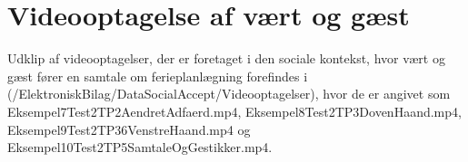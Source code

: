 \section{Videooptagelse af vært og gæst}
\label{app:VideooptagelseVaertOgGaest}
%
Udklip af videooptagelser, der er foretaget i den sociale kontekst, hvor vært og gæst fører en samtale om ferieplanlægning forefindes i (/ElektroniskBilag/DataSocialAccept/Videooptagelser), hvor de er angivet som Eksempel7Test2TP2AendretAdfaerd.mp4, Eksempel8Test2TP3DovenHaand.mp4, Eksempel9Test2TP36VenstreHaand.mp4 og Eksempel10Test2TP5SamtaleOgGestikker.mp4.
%

